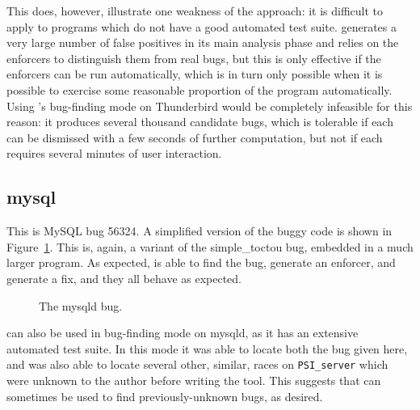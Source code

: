 This does, however, illustrate one weakness of the {\technique}
approach: it is difficult to apply to programs which do not have a
good automated test suite.  {\Technique} generates a very large number
of false positives in its main analysis phase and relies on the
enforcers to distinguish them from real bugs, but this is only
effective if the enforcers can be run automatically, which is in turn
only possible when it is possible to exercise some reasonable
proportion of the program automatically.  Using {\technique}'s
bug-finding mode on Thunderbird would be completely infeasible for
this reason: it produces several thousand candidate bugs, which is
tolerable if each can be dismissed with a few seconds of further
computation, but not if each requires several minutes of user
interaction.

\subsection{mysql}

This is MySQL bug 56324\needCite{}.  A simplified version of the buggy
code is shown in Figure~\ref{fig:eval:mysqld}.  This is, again, a
variant of the simple\_toctou bug, embedded in a much larger program.
As expected, {\implementation} is able to find the bug, generate an
enforcer, and generate a fix, and they all behave as expected.

\begin{figure}
  \caption{The mysqld bug.}
  \label{fig:eval:mysqld}
\end{figure}

{\Implementation} can also be used in bug-finding mode on mysqld, as
it has an extensive automated test suite.  In this mode it was able to
locate both the bug given here, and was also able to locate several
other, similar, races on \texttt{PSI\_server} which were unknown to
the author before writing the tool.  This suggests that
{\implementation} can sometimes be used to find previously-unknown
bugs, as desired.

